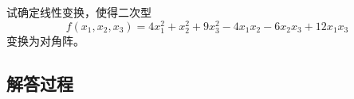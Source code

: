 \begin{example}[二次型对角化]
    试确定线性变换，使得二次型  
    \[
    f(x_1, x_2, x_3) = 4x_1^2 + x_2^2 + 9x_3^2 - 4x_1x_2 - 6x_2x_3 + 12x_1x_3
    \]
    变换为对角阵。
    \end{example}
    
    \subsection*{解答过程}
    